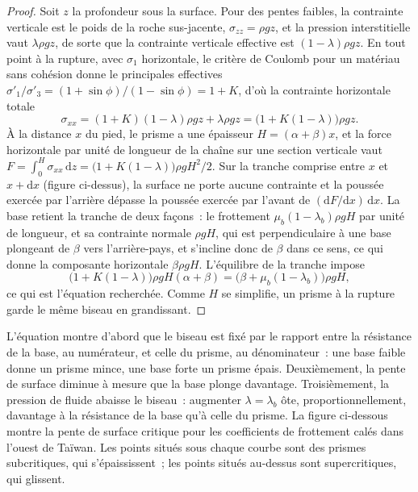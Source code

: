 \begin{proof}
Soit $z$ la profondeur sous la surface. Pour des pentes faibles, la contrainte verticale
est le poids de la roche sus-jacente, $\sigma_{zz} = \rho g z$, et la pression
interstitielle vaut $\lambda\rho g z$, de sorte que la contrainte verticale effective est
$(1 - \lambda)\rho g z$. En tout point à la rupture, avec $\sigma_1$ horizontale,
le critère de Coulomb pour un matériau sans cohésion donne le  principales effectives $\sigma'_1/\sigma'_3 = (1 + \sin\phi)/(1 -
\sin\phi) = 1 + K$, d'où la contrainte horizontale totale
\[
  \sigma_{xx} = (1 + K)(1 - \lambda)\rho g z + \lambda\rho g z
  = \bigl(1 + K(1 - \lambda)\bigr)\rho g z .
\]
À la distance $x$ du pied, le prisme a une épaisseur $H = (\alpha +
\beta)x$, et la force horizontale par unité de longueur de la chaîne sur une section verticale
vaut $F = \int_0^H \sigma_{xx}\,\mathrm dz = \bigl(1 + K(1 -
\lambda)\bigr)\rho g H^2/2$. Sur la tranche comprise entre $x$ et $x + \mathrm dx$
(figure ci-dessus), la surface ne porte aucune contrainte et la poussée exercée par l'arrière
dépasse la poussée exercée par l'avant de $(\mathrm dF/\mathrm dx)\,\mathrm dx$.
La base retient la tranche de deux façons~: le frottement $\mu_b(1 -
\lambda_b)\rho g H$ par unité de longueur, et sa contrainte normale $\rho g H$, qui
est perpendiculaire à une base plongeant de $\beta$ vers l'arrière-pays, et s'incline donc
de $\beta$ dans ce sens, ce qui donne la composante horizontale $\beta\rho g H$.
L'équilibre de la tranche impose
\[
  \bigl(1 + K(1 - \lambda)\bigr)\rho g H(\alpha + \beta)
  = \bigl(\beta + \mu_b(1 - \lambda_b)\bigr)\rho g H ,
\]
ce qui est l'équation recherchée. Comme $H$ se simplifie, un prisme à la rupture garde le même
biseau en grandissant.
\end{proof}

L'équation montre d'abord que le biseau est fixé par le rapport entre la résistance
de la base, au numérateur, et celle du prisme, au
dénominateur~: une base faible donne un prisme mince, une base forte un prisme épais.
Deuxièmement, la pente de surface diminue à mesure que la base plonge davantage. Troisièmement, la pression de fluide
abaisse le biseau~: augmenter $\lambda = \lambda_b$ ôte, proportionnellement, davantage
à la résistance de la base qu'à celle du prisme.
La figure ci-dessous montre la pente de surface critique pour les
coefficients de frottement calés dans l'ouest de Taïwan. Les points situés sous chaque courbe sont des
prismes subcritiques, qui s'épaississent~; les points situés au-dessus sont supercritiques, qui glissent.

